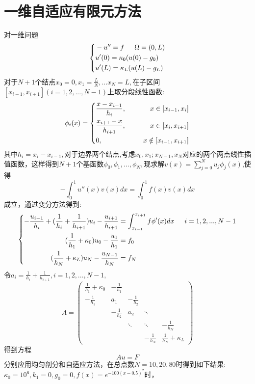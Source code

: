 \documentclass[12pt]{ctexart}
\begin{document}
\section{一维自适应有限元方法}
对一维问题
$$\left\{
\begin{aligned}
&-u'' = f\indent \Omega = (0,L) \\
& u'(0) =\kappa_0(u(0)-g_0) \\
& u'(L) = \kappa_L(u(L)-g_L)\\
\end{aligned}
\right.$$
对于$N+1$个结点$x_0=0,x_1 = \frac{L}{N},...x_N=L,$在子区间$[x_{i-1},x_{i+1}](i=1,2,...,N-1)$上取分段线性函数:
$$\phi_i(x)=\left\{
\begin{aligned}
&\frac{x-x_{i-1}}{h_i},\indent &x\in[x_{i-1},x_i]\\
&\frac{x_{i+1}-x}{h_{i+1}},\indent &x\in [x_i,x_{i+1}] \\
&0,	\indent &x \notin [x_{i-1},x_{i+1}]
\end{aligned}
\right.$$其中$h_i=x_i-x_{i-1},$对于边界两个结点,考虑$x_0,x_1;x_{N-1},x_N$对应的两个两点线性插值函数，这样得到$N+1$个基函数$\phi_0,\phi_1,...,\phi_N,$现求解$v(x)= \sum_{j=0}^{N}u_j\phi_j(x)$,使得
$$ -\int_{0}^{1}u''(x)v(x)dx = \int_{0}^{1}f(x)v(x)dx $$
成立，通过变分方法得到:
$$\left\{
\begin{aligned}
 -\frac{u_{i-1}}{h_i}+(\frac{1}{h_i}+\frac{1}{h_{i+1}})u_i-\frac{u_{i+1}}{h_{i+1}} &= \int_{x_{i-1}}^{x_{i+1}}f\phi'(x)dx \indent i=1,2,...,N-1\\
(\frac{1}{h_1}+\kappa_0)u_0-\frac{u_1}{h_1} &= f_0 \\
(\frac{1}{h_N}+\kappa_L)u_N-\frac{u_{N-1}}{h_N} &= f_N \\
\end{aligned}
\right.
$$
令$a_i = \frac{1}{h_i}+\frac{1}{h_{i+1}},i=1,2,...,N-1,$
$$
A = 
\begin{pmatrix}
\frac{1}{h_1}+\kappa_0 & -\frac{1}{h_1}\\
-\frac{1}{h_1}& a_1& -\frac{1}{h_2} \\
& -\frac{1}{h_2}& a_2 & \ddots \\
& & \ddots & \ddots & -\frac{1}{h_{N}}\\
& & & -\frac{1}{h_{N}} & \frac{1}{h_N}+\kappa_L 
\end{pmatrix}
$$
得到方程$$Au = F$$分别应用均匀剖分和自适应方法，在总点数$N=10,20,80$时得到如下结果:\\
$\kappa_0=10^6,k_1=0,g_0=0,f(x)=e^{-100(x-0.5)^2}$时，\\
\end{document}
